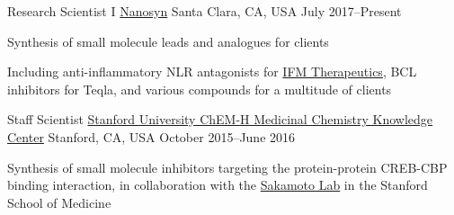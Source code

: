 

\begin{cventries}
	

	\cventry
	{Research Scientist I} %
	{\href{http://nanosyn.com/}{Nanosyn}} %
	{Santa Clara, CA, USA} %
	{July 2017--Present} %
	{
		\begin{cvitems} %
			\item {Synthesis of small molecule leads and analogues for clients}
			\item {Including anti-inflammatory NLR antagonists for \href{http://www.ifmthera.com/}{IFM Therapeutics}, BCL inhibitors for Teqla, and various compounds for a multitude of clients}
		\end{cvitems}
	}
	
	\cventry
	{Staff Scientist} %
	{\href{https://chemh.stanford.edu/knowledge-centers/medicinal-chemistry-knowledge-center}{Stanford University ChEM-H Medicinal Chemistry Knowledge Center}} %
	{Stanford, CA, USA} %
	{October 2015--June 2016} %
	{
		\begin{cvitems} %
			\item {Synthesis of small molecule inhibitors targeting the protein-protein CREB-CBP binding interaction, in collaboration with the \href{http://sakamotolab.com/index.htm}{Sakamoto Lab} in the Stanford School of Medicine}
		\end{cvitems}
	}
	
\end{cventries}